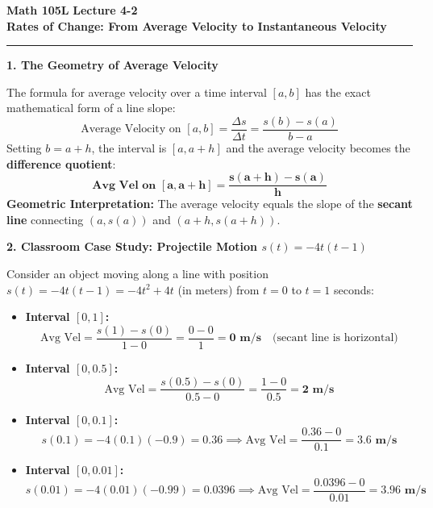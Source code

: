 \documentclass[10.5pt]{article}
\begin{document}
\noindent \textbf{\large Math 105L} \hfill \textbf{\large Lecture 4-2}\\[1pt]
{\textbf{\Large Rates of Change: From Average Velocity to Instantaneous Velocity}}\\[-5pt]
\rule{\textwidth}{1.2pt}

\vspace{0.03in}

\textbf{\large 1. The Geometry of Average Velocity}

The formula for average velocity over a time interval $[a, b]$ has the exact mathematical form of a line slope:
\[
  \text{Average Velocity on } [a, b] = \frac{\Delta s}{\Delta t} = \frac{s(b) - s(a)}{b - a}
\]
Setting $b = a + h$, the interval is $[a, a + h]$ and the average velocity becomes the \textbf{difference quotient}:
\[
  \mathbf{\text{Avg Vel on } [a, a+h] = \frac{s(a+h) - s(a)}{h}}
\]
\textbf{Geometric Interpretation:} The average velocity equals the slope of the \textbf{secant line} connecting $(a, s(a))$ and $(a+h, s(a+h))$.

\vspace{0.03in}

\textbf{\large 2. Classroom Case Study: Projectile Motion $s(t) = -4t(t-1)$}

Consider an object moving along a line with position $s(t) = -4t(t-1) = -4t^2 + 4t$ (in meters) from $t = 0$ to $t = 1$ seconds:

\begin{itemize}[leftmargin=1.2em, topsep=1pt, itemsep=3pt]
  \item \textbf{Interval $[0, 1]$:}
  \[
    \text{Avg Vel} = \frac{s(1) - s(0)}{1 - 0} = \frac{0 - 0}{1} = \mathbf{0 \text{ m/s}} \quad \text{(secant line is horizontal)}
  \]
  \item \textbf{Interval $[0, 0.5]$:}
  \[
    \text{Avg Vel} = \frac{s(0.5) - s(0)}{0.5 - 0} = \frac{1 - 0}{0.5} = \mathbf{2 \text{ m/s}}
  \]
  \item \textbf{Interval $[0, 0.1]$:}
  \[
    s(0.1) = -4(0.1)(-0.9) = 0.36 \implies \text{Avg Vel} = \frac{0.36 - 0}{0.1} = \mathbf{3.6 \text{ m/s}}
  \]
  \item \textbf{Interval $[0, 0.01]$:}
  \[
    s(0.01) = -4(0.01)(-0.99) = 0.0396 \implies \text{Avg Vel} = \frac{0.0396 - 0}{0.01} = \mathbf{3.96 \text{ m/s}}
  \]
\end{itemize}
\end{document}
